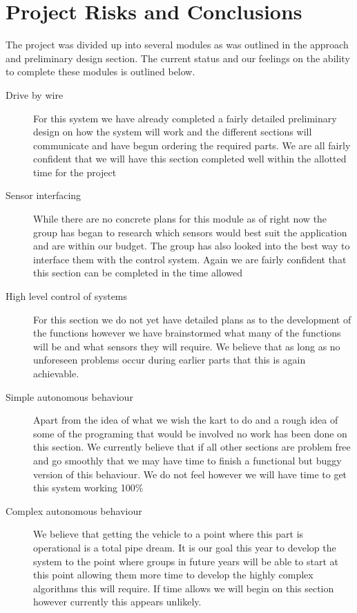 \chapter{Project Risks and Conclusions}

The project was divided up into several modules as was outlined in the approach and preliminary design section. The current status and our feelings on the ability to complete these modules is outlined below.

\begin{description}
\item[Drive by wire] For this system we have already completed a fairly detailed preliminary design on how the system will work and the different sections will communicate and have begun ordering the required parts. We are all fairly confident that we will have this section completed well within the allotted time for the project

\item[Sensor interfacing] While there are no concrete plans for this module as of right now the group has began to research which sensors would best suit the application and are within our budget. The group has also looked into the best way to interface them with the control system. Again we are fairly confident that this section can be completed in the time allowed

\item[High level control of systems] For this section we do not yet have detailed plans as to the development of the functions however we have brainstormed what many of the functions will be and what sensors they will require. We believe that as long as no unforeseen problems occur during earlier parts that this is again achievable.

\item[Simple autonomous behaviour] Apart from the idea of what we wish the kart to do and a rough idea of some of the programing that would be involved no work has been done on this section. We currently believe that if all other sections are problem free and go smoothly that we may have time to finish a functional but buggy version of this behaviour. We do not feel however we will have time to get this system working 100\%

\item[Complex autonomous behaviour] We believe that getting the vehicle to a point where this part is operational is a total pipe dream. It is our goal this year to develop the system to the point where groups in future years will be able to start at this point allowing them more time to develop the highly complex algorithms this will require. If time allows we will begin on this section however currently this appears unlikely.
\end{description}